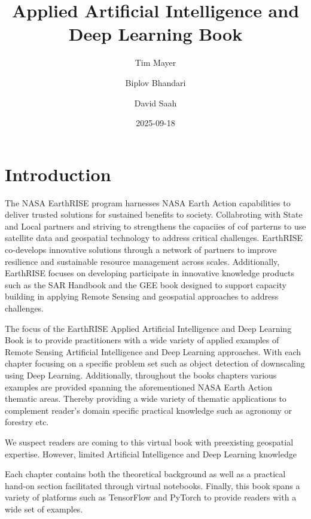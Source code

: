 \documentclass[
  letterpaper,
  DIV=11,
  numbers=noendperiod]{scrreprt}
\title{Applied Artificial Intelligence and Deep Learning Book}
\author{Tim Mayer \and Biplov Bhandari \and David Saah}
\date{2025-09-18}
\renewcommand*\contentsname{Table of contents}
\newcommand\contentsname{Table of contents}
\begin{document}
\maketitle

\renewcommand*\contentsname{Table of contents}
{
\hypersetup{linkcolor=}
\setcounter{tocdepth}{2}
\tableofcontents
}


\chapter*{Introduction}\label{introduction}


The NASA EarthRISE program harnesses NASA Earth Action capabilities to
deliver trusted solutions for sustained benefits to society.
Collabroting with State and Local partners and striving to strengthens
the capaciies of cof parterns to use satellite data and geospatial
technology to address critical challenges. EarthRISE co-develops
innovative solutions through a network of partners to improve resilience
and sustainable resource management across scales. Additionally,
EarthRISE focuses on developing participate in innovative knowledge
products such as the SAR Handbook and the GEE book designed to support
capacity building in applying Remote Sensing and geospatial approaches
to address challenges.

The focus of the EarthRISE Applied Artificial Intelligence and Deep
Learning Book is to provide practitioners with a wide variety of applied
examples of Remote Sensing Artificial Intelligence and Deep Learning
approaches. With each chapter focusing on a specific problem set such as
object detection of downscaling using Deep Learning. Additionally,
throughout the books chapters various examples are provided spanning the
aforementioned NASA Earth Action thematic areas. Thereby providing a
wide variety of thematic applications to complement reader's domain
specific practical knowledge such as agronomy or forestry etc.

We suspect readers are coming to this virtual book with preexisting
geospatial expertise. However, limited Artificial Intelligence and Deep
Learning knowledge

Each chapter contains both the theoretical background as well as a
practical hand-on section facilitated through virtual notebooks.
Finally, this book spans a variety of platforms such as TensorFlow and
PyTorch to provide readers with a wide set of examples.
\end{document}

